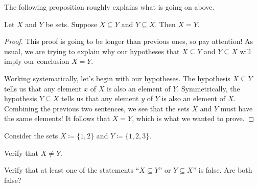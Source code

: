 \documentclass[../notes.tex]{subfiles}
\begin{document}
The following proposition roughly explains what is going on above.
\begin{proposition} \label{prop:subset-reflexive}
    Let $X$ and $Y$ be sets. Suppose $X\subseteq Y$ and $Y\subseteq X$. Then $X=Y$.
\end{proposition}
\begin{proof}
    This proof is going to be longer than previous ones, so pay attention! As usual, we are trying to explain why our hypotheses that $X\subseteq Y$ and $Y\subseteq X$ will imply our conclusion $X=Y$.

    Working systematically, let's begin with our hypotheses. The hypothesis $X\subseteq Y$ tells us that any element $x$ of $X$ is also an element of $Y$. Symmetrically, the hypothesis $Y\subseteq X$ tells us that any element $y$ of $Y$ is also an element of $X$. Combining the previous two sentences, we see that the sets $X$ and $Y$ must have the same elements! It follows that $X=Y$, which is what we wanted to prove.
\end{proof}
\begin{exercise}
    Consider the sets $X\coloneqq\{1,2\}$ and $Y\coloneqq\{1,2,3\}$.
    \begin{listalph}
        \item Verify that $X\ne Y$.
        \item Verify that at least one of the statements ``$X\subseteq Y$'' or $Y\subseteq X$'' is false. Are both false?
    \end{listalph}
\end{exercise}
\end{document}
